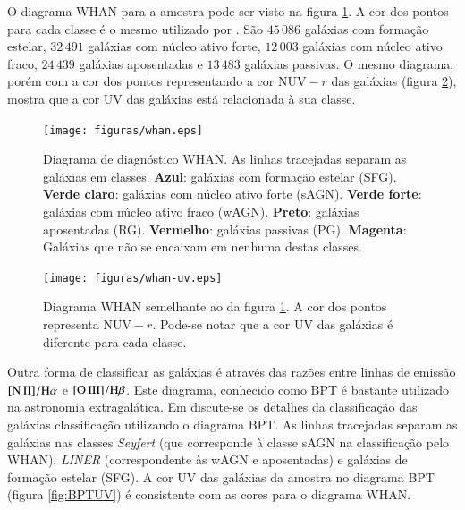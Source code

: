O diagrama WHAN para a amostra \starlightUV pode ser visto na figura
\ref{fig:Whan}. A cor dos pontos para cada classe é o mesmo utilizado por
\citet{CidFernandes2011}. São $45\,086$ galáxias com formação estelar, $32\,491$
galáxias com núcleo ativo forte, $12\,003$ galáxias com núcleo ativo fraco,
$24\,439$ galáxias aposentadas e $13\,483$ galáxias passivas. O mesmo diagrama,
porém com a cor dos pontos representando a cor $\mathrm{NUV}-r$ das galáxias
(figura \ref{fig:WhanUV}), mostra que a cor UV das galáxias está relacionada à
sua classe.

\begin{figure}
	\texttt{[image: figuras/whan.eps]}
	\caption[Diagrama de diagnóstico WHAN.]
	{Diagrama de diagnóstico WHAN. As linhas tracejadas separam as galáxias
	em classes. \textbf{Azul}: galáxias com formação estelar (SFG). \textbf{Verde
	claro}: galáxias com núcleo ativo forte (sAGN). \textbf{Verde forte}:
	galáxias com núcleo ativo fraco (wAGN). \textbf{Preto}: galáxias aposentadas
	(RG). \textbf{Vermelho}: galáxias passivas (PG). \textbf{Magenta}: Galáxias
	que não se encaixam em nenhuma destas classes.}
	\label{fig:Whan}
\end{figure}

\begin{figure}
	\texttt{[image: figuras/whan-uv.eps]}
	\caption[Cores UV no diagrama WHAN.]
	{Diagrama WHAN semelhante ao da figura \ref{fig:Whan}. A cor dos pontos
	representa $\mathrm{NUV}-r$. Pode-se notar que a cor UV das galáxias é
	diferente para cada classe.}
	\label{fig:WhanUV}
\end{figure}

Outra forma de classificar as galáxias é através das razões entre linhas de
emissão $\nII/\Halpha$ e $\oIII/\Hbeta$. Este diagrama, conhecido como BPT
\citep{Baldwin1981} é bastante utilizado na astronomia extragalática. Em
\citet{CidFernandes2010} discute-se os detalhes da classificação das galáxias
classificação utilizando o diagrama BPT. As linhas tracejadas separam as
galáxias nas classes {\em Seyfert} (que corresponde à classe sAGN na
classificação pelo WHAN), {\em LINER} (correspondente às wAGN e aposentadas) e
galáxias de formação estelar (SFG). A cor UV das galáxias da amostra no diagrama
BPT (figura \ref{fig:BPTUV}) é consistente com as cores para o diagrama WHAN.


